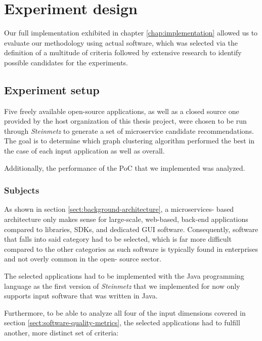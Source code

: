 \documentclass[12pt,a4paper]{report}
\begin{document}
\chapter{Experiment design} \label{chap:experiment-design}

Our full implementation exhibited in chapter \ref{chap:implementation} allowed
us to evaluate our methodology using actual software, which was selected via
the definition of a multitude of criteria followed by extensive research to
identify possible candidates for the experiments.



\section{Experiment setup}

Five freely available open-source applications, as well as a closed source one
provided by the host organization of this thesis project, were chosen to be run
through \textit{Steinmetz} to generate a set of microservice candidate
recommendations. The goal is to determine which graph clustering algorithm
performed the best in the case of each input application as well as overall.

Additionally, the performance of the PoC that we implemented was analyzed.


\subsection{Subjects}

As shown in section \ref{sect:background-architecture}, a microservices\hyp
based architecture only makes sense for large\hyp scale, web\hyp based,
back\hyp end applications compared to libraries, SDKs, and dedicated GUI
software. Consequently, software that falls into said category had to be
selected, which is far more difficult compared to the other categories as such
software is typically found in enterprises and not overly common in the open\hyp
source sector.

The selected applications had to be implemented with the Java
programming language as the first version of \textit{Steinmetz} that we
implemented for now only supports input software that was written in Java.

Furthermore, to be able to analyze all four of the input dimensions covered in
section \ref{sect:software-quality-metrics}, the selected applications had to
fulfill another, more distinct set of criteria:
\end{document}

